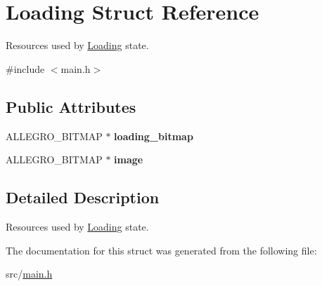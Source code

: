 \hypertarget{structLoading}{\section{\-Loading \-Struct \-Reference}
\label{structLoading}
}


\-Resources used by \hyperlink{structLoading}{\-Loading} state.  




{\ttfamily \#include $<$main.\-h$>$}

\subsection*{\-Public \-Attributes}
\begin{DoxyCompactItemize}
\item 
\hypertarget{structLoading_aa6c655f5a0c41583f9c1a547ca81b98b}{\-A\-L\-L\-E\-G\-R\-O\-\_\-\-B\-I\-T\-M\-A\-P $\ast$ {\bfseries loading\-\_\-bitmap}}\label{structLoading_aa6c655f5a0c41583f9c1a547ca81b98b}

\item 
\hypertarget{structLoading_a1d0c3f575a47ca8928fe0b5af85059c9}{\-A\-L\-L\-E\-G\-R\-O\-\_\-\-B\-I\-T\-M\-A\-P $\ast$ {\bfseries image}}\label{structLoading_a1d0c3f575a47ca8928fe0b5af85059c9}

\end{DoxyCompactItemize}


\subsection{\-Detailed \-Description}
\-Resources used by \hyperlink{structLoading}{\-Loading} state. 

\-The documentation for this struct was generated from the following file\-:\begin{DoxyCompactItemize}
\item 
src/\hyperlink{main_8h}{main.\-h}\end{DoxyCompactItemize}
